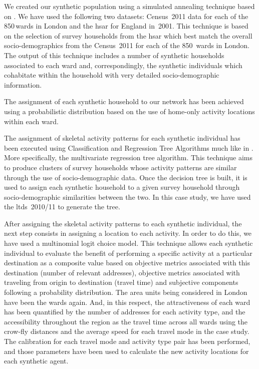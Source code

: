 We created our synthetic population using a simulated annealing technique based on \citet[][]{metropolissampling}. We have used the following two datasets: Census~2011 data for each of the 850\,wards in London and the \gls{hsar} for England in~2001. This technique is based on the selection of survey households from the \gls{hsar} which best match the overall socio-demographics from the Census~2011 for each of the 850\, wards in London. The output of this technique includes a number of synthetic households associated to each ward and, correspondingly, the synthetic individuals which cohabitate within the household with very detailed socio-demographic information.

The assignment of each synthetic household to our network has been achieved using a probabilistic distribution based on the use of home-only activity locations within each ward.

The assignment of skeletal activity patterns for each synthetic individual has been executed using Classification and Regression Tree Algorithms much like in \citet[][]{SpeckmanEtAl_TechRep_NISS_1998}. More specifically, the multivariate regression tree algorithm. This technique aims to produce clusters of survey households whose activity patterns are similar through the use of socio-demographic data. Once the decision tree is built, it is used to assign each synthetic household to a given survey household through socio-demographic similarities between the two. In this case study, we have used the \gls{ltds}~2010/11 to generate the tree.

After assigning the skeletal activity patterns to each synthetic individual, the next step consists in assigning a location to each activity. In order to do this, we have used a multinomial logit choice model. This technique allows each synthetic individual to evaluate the benefit of performing a specific activity at a particular destination as a composite value based on objective metrics associated with this destination (\eg number of relevant addresses), objective metrics associated with traveling from origin to destination (\eg travel time) and subjective components following a probability distribution. The area units being considered in London have been the wards again. And, in this respect, the attractiveness of each ward has been quantified by the number of addresses for each activity type, and the accessibility throughout the region as the travel time across all wards using the crow-fly distances and the average speed for each travel mode in the case study. The calibration for each travel mode and activity type pair has been performed, and those parameters have been used to calculate the new activity locations for each synthetic agent.

